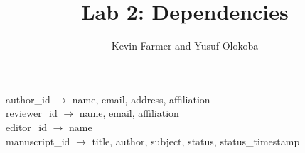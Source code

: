 \documentclass{article}
\title{Lab 2: Dependencies}
\author{Kevin Farmer and Yusuf Olokoba}
\begin{document}
\maketitle


author\_id $\rightarrow$ name, email, address, affiliation \\
reviewer\_id $\rightarrow$ name, email, affiliation \\
editor\_id $\rightarrow$ name \\

manuscript\_id $\rightarrow$ title, author, subject, status, status\_timestamp \\
\end{document}
